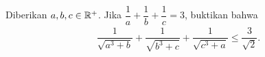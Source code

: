 Diberikan $a,b,c \in \mathbb R^+$. Jika $\dfrac{1}{a}+\dfrac{1}{b}+\dfrac{1}{c}=3$, buktikan bahwa
\begin{align*}
    \dfrac{1}{\sqrt{a^3+b}}+\dfrac{1}{\sqrt{b^3+c}}+\dfrac{1}{\sqrt{c^3+a}} \le \dfrac{3}{\sqrt{2}}.
\end{align*}